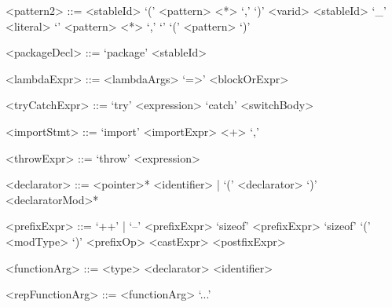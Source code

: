 \documentclass[10pt,letterpaper]{article}
\begin{document}
\begin{grammar}
  <pattern2> ::= <stableId> `(' <pattern> <*> `,' `)'
    \alt <varid>
    \alt <stableId>
    \alt `_'
    \alt <literal>
    \alt `{' <pattern> <*> `,' `}'
    \alt `(' <pattern> `)'
  
  <packageDecl> ::= `package' <stableId>
  
  <lambdaExpr> ::= <lambdaArgs> `=>' <blockOrExpr>
  
  <tryCatchExpr> ::= `try' <expression> `catch' <switchBody>
  
  <importStmt> ::= `import' <importExpr> <+> `,'
  
  <throwExpr> ::= `throw' <expression>
  
  <declarator> ::= <pointer>* 
    <identifier> |
    `(' <declarator> `)' <declaratorMod>*
  
  <prefixExpr> ::= 
    `++' |
    `--' <prefixExpr>
    \alt `sizeof' <prefixExpr>
    \alt `sizeof' `(' <modType> `)'
    \alt <prefixOp> <castExpr>
    \alt <postfixExpr>
  
  <functionArg> ::= <type> <declarator>
    \alt <identifier>
  
  <repFunctionArg> ::= <functionArg> `...'
\end{grammar}
\end{document}
